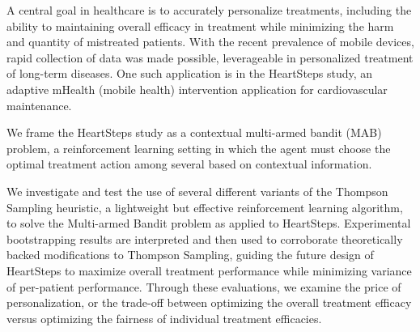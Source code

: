 
A central goal in healthcare is to accurately personalize treatments, including the ability to maintaining overall efficacy in treatment while minimizing the harm and quantity of mistreated patients. With the recent prevalence of mobile devices, rapid collection of data was made possible, leverageable in personalized treatment of long-term diseases.  One such application is in the HeartSteps study, an adaptive mHealth (mobile health) intervention application for cardiovascular maintenance.

We frame the HeartSteps study as a contextual multi-armed bandit (MAB) problem, a reinforcement learning setting in which the agent must choose the optimal treatment action among several based on contextual information.

We investigate and test the use of several different variants of the Thompson Sampling heuristic, a lightweight but effective reinforcement learning algorithm, to solve the Multi-armed Bandit problem as applied to HeartSteps. Experimental bootstrapping results are interpreted and then used to corroborate theoretically backed modifications to Thompson Sampling, guiding the future design of HeartSteps to maximize overall treatment performance while minimizing variance of per-patient performance. Through these evaluations, we examine the price of personalization, or the trade-off between optimizing the overall treatment efficacy versus optimizing the fairness of individual treatment efficacies.
